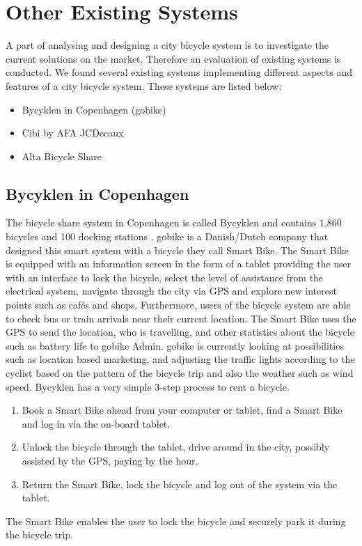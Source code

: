 \section{Other Existing Systems}
A part of analysing and designing a city bicycle system is to investigate the current solutions on the market. 
Therefore an evaluation of existing systems is conducted.
We found several existing systems implementing different aspects and features of a city bicycle system. 
These systems are listed below:
\begin{itemize}
\item Bycyklen in Copenhagen (gobike)
\item Cibi by AFA JCDecaux
\item Alta Bicycle Share
\end{itemize}
\subsection{Bycyklen in Copenhagen}
The bicycle share system in Copenhagen is called Bycyklen and contains 1,860 bicycles and 100 docking stations \citep{misc:bycyklen}. 
gobike is a Danish/Dutch company that designed this smart system with a bicycle they call Smart Bike. 
The Smart Bike is equipped with an information screen in the form of a tablet providing the user with an interface to lock the bicycle, select the level of assistance from the electrical system, navigate through the city via GPS and explore new interest points such as cafés and shops.
Furthermore, users of the bicycle system are able to check bus or train arrivals near their current location.
The Smart Bike uses the GPS to send the location, who is travelling, and other statistics about the bicycle such as battery life to gobike Admin.
gobike is currently looking at possibilities such as location based marketing, and adjusting the traffic lights according to the cyclist based on the pattern of the bicycle trip and also the weather such as wind speed.
Bycyklen has a very simple 3-step process to rent a bicycle.
\begin{enumerate}
\item Book a Smart Bike ahead from your computer or tablet, find a Smart Bike and log in via the on-board tablet.
\item Unlock the bicycle through the tablet, drive around in the city, possibly assisted by the GPS, paying by the hour.
\item Return the Smart Bike, lock the bicycle and log out of the system via the tablet.
\end{enumerate}
The Smart Bike enables the user to lock the bicycle and securely park it during the bicycle trip.

